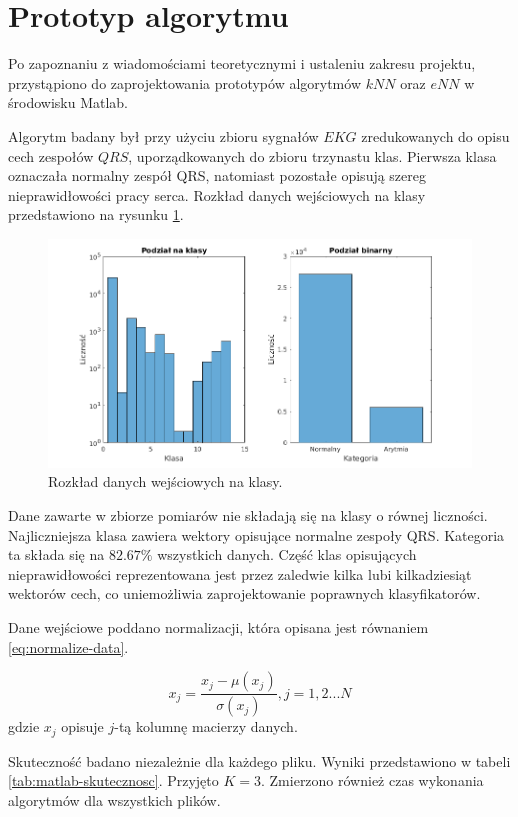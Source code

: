 \section{Prototyp algorytmu}
Po zapoznaniu z wiadomościami teoretycznymi i ustaleniu zakresu projektu, przystąpiono do zaprojektowania prototypów algorytmów $kNN$ oraz $eNN$ w środowisku Matlab.

Algorytm badany był przy użyciu zbioru sygnałów $EKG$ zredukowanych do opisu cech zespołów $QRS$, uporządkowanych do zbioru trzynastu klas. Pierwsza klasa oznaczała normalny zespół QRS, natomiast pozostałe opisują szereg nieprawidłowości pracy serca.
Rozkład danych wejściowych na klasy przedstawiono na rysunku \ref{fig:klasy-danych}.

\begin{figure}[H]
	\centering
	\includegraphics[width=18cm]{img/licznosc_klas}
	\caption{Rozkład danych wejściowych na klasy.}
	\label{fig:klasy-danych}
\end{figure}
Dane zawarte w zbiorze pomiarów nie składają się na klasy o równej liczności. Najliczniejsza klasa zawiera wektory opisujące normalne zespoły QRS. Kategoria ta składa się na $82.67\%$ wszystkich danych. Część klas opisujących nieprawidłowości reprezentowana jest przez zaledwie kilka lubi kilkadziesiąt wektorów cech, co uniemożliwia zaprojektowanie poprawnych klasyfikatorów.

Dane wejściowe poddano normalizacji, która opisana jest równaniem \ref{eq:normalize-data}.

\begin{equation}
\label{eq:normalize-data}
x_j = \frac{x_j - \mu(x_j)}{\sigma(x_j)}, j=1,2...N
\end{equation}
gdzie $x_j$ opisuje $j$-tą kolumnę macierzy danych.

Skuteczność badano niezależnie dla każdego pliku. Wyniki przedstawiono w tabeli \ref{tab:matlab-skutecznosc}. Przyjęto $K=3$. Zmierzono również czas wykonania algorytmów dla wszystkich plików.


